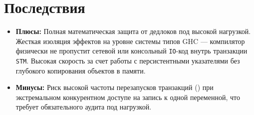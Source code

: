 \documentclass{article}
\begin{document}
\section*{Последствия}
\begin{itemize}
    \item \textbf{Плюсы:} Полная математическая защита от дедлоков под высокой нагрузкой. Жесткая изоляция эффектов на уровне системы типов GHC — компилятор физически не пропустит сетевой или консольный \texttt{IO}-код внутрь транзакции \texttt{STM}. Высокая скорость за счет работы с персистентными указателями без глубокого копирования объектов в памяти.
    \item \textbf{Минусы:} Риск высокой частоты перезапусков транзакций () при экстремальном конкурентном доступе на запись к одной переменной, что требует обязательного аудита под нагрузкой.
\end{itemize}
\end{document}
